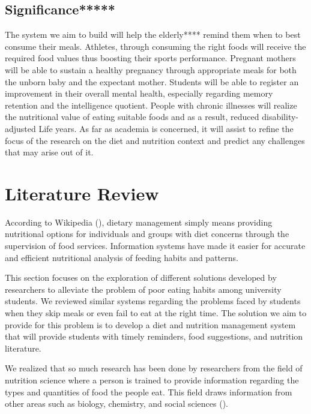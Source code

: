 \documentclass{article}
\begin{document}
\subsection{Significance*****}
The system we aim to build will help the elderly**** remind them when to best consume their meals. Athletes, through consuming the right foods will receive the required food values thus boosting their sports performance. Pregnant mothers will be able to sustain a healthy pregnancy through appropriate meals for both the unborn baby and the expectant mother. Students will be able to register an improvement in their overall mental health, especially regarding memory retention and the intelligence quotient.  People with chronic illnesses will realize the nutritional value of eating suitable foods and as a result, reduced disability-adjusted Life years. As far as academia is concerned, it will assist to refine the focus of the research on the diet and nutrition context and predict any challenges that may arise out of it.


\newpage
\section{Literature Review}

According to Wikipedia (\citeyear{wikipedia2019dietary}), dietary management simply means providing nutritional options for individuals and groups with diet concerns through the supervision of food services. Information systems have made it easier for accurate and efficient nutritional analysis of feeding habits and patterns.

This section focuses on the exploration of different solutions developed by researchers to alleviate the problem of poor eating habits among university students. We reviewed similar systems regarding the problems faced by students when they skip meals or even fail to eat at the right time. The solution we aim to provide for this problem is to develop a diet and nutrition management system that will provide students with timely reminders, food suggestions, and nutrition literature.

We realized that so much research has been done by researchers from the field of nutrition science where a person is trained to provide information regarding the types and quantities of food the people eat. This field draws information from other areas such as biology, chemistry, and social sciences (\cite{sriram2020hire}).
\end{document}
